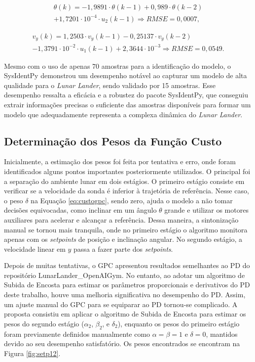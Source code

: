 \documentclass[12pt,           %
a4paper,                       %
openany,                       %
oneside,                       %
chapter=TITLE,                 %
english,                       %
spanish,                       %
brazil,                        %
sumario=tradicional]{abntex2}  %
\begin{document}
\begin{OnehalfSpace}
\begin{equation}
\begin{matrix}
    \theta(k) = -1,9891\cdot \theta(k-1) +0,989\cdot \theta(k-2)\\
    +1,7201\cdot 10^{-4}\cdot u_2(k-1)\Rightarrow RMSE=0,0007,
\end{matrix} 
\end{equation}

\begin{equation}
\begin{matrix}
    v_y(k) = 1,2503\cdot v_y(k-1) - 0,25137\cdot v_y(k-2)\\
    -1,3791\cdot 10^{-2}\cdot u_1(k-1)+2,3644\cdot 10^{-3}\Rightarrow RMSE=0,0549.
\end{matrix} 
\end{equation}

Mesmo com o uso de apenas 70 amostras para a identificação do modelo, o SysIdentPy demonstrou um desempenho notável ao capturar um modelo de alta qualidade para o \textit{Lunar Lander}, sendo validado por 15 amostras. Esse desempenho ressalta a eficácia e a robustez do pacote SysIdentPy, que conseguiu extrair informações precisas o suficiente das amostras disponíveis para formar um modelo que adequadamente representa a complexa dinâmica do \textit{Lunar Lander}.

\subsection{Determinação dos Pesos da Função Custo}
\label{subsec:GPCpesos}  

Inicialmente, a estimação dos pesos foi feita por tentativa e erro, onde foram identificados alguns pontos importantes posteriormente utilizados. O principal foi a separação do ambiente lunar em dois estágios. O primeiro estágio consiste em verificar se a velocidade da sonda é inferior à trajetória de referência. Nesse caso, o peso $\delta$ na Equação \ref{eq:custogpc}, sendo zero, ajuda o modelo a não tomar decisões equivocadas, como inclinar em um ângulo $\theta$ grande e utilizar os motores auxiliares para acelerar e alcançar a referência. Dessa maneira, a sintonização manual se tornou mais tranquila, onde no primeiro estágio o algoritmo monitora apenas com os \textit{setpoints} de posição e inclinação angular. No segundo estágio, a velocidade linear em $y$ passa a fazer parte dos \textit{setpoints}.

Depois de muitas tentativas, o GPC apresentou resultados semelhantes ao PD do repositório LunarLander\_OpenAIGym. No entanto, ao adotar um algoritmo de Subida de Encosta para estimar os parâmetros proporcionais e derivativos do PD deste trabalho, houve uma melhoria significativa no desempenho do PD. Assim, um ajuste manual do GPC para se equiparar ao PD tornou-se complicado. A proposta consistiu em aplicar o algoritmo de Subida de Encosta para estimar os pesos do segundo estágio ($\alpha_2$, $\beta_2$, e $\delta_2$), enquanto os pesos do primeiro estágio foram previamente definidos manualmente como $\alpha=\beta=1$ e $\delta=0$, mantidos devido ao seu desempenho satisfatório. Os pesos encontrados se encontram na Figura \ref{fig:setp12}.


\end{OnehalfSpace}
\end{document}
